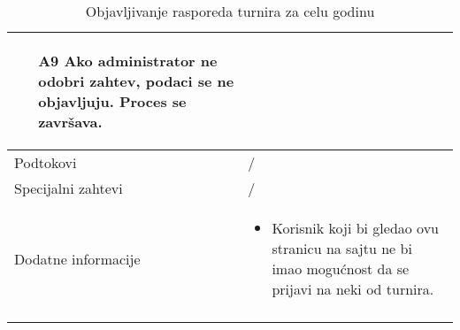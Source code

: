 \documentclass{article}
\begin{document}
\begin{longtable}{| p{} | p{} |}
\begin{itemize}
                    \item[A9] Ako administrator ne odobri zahtev, podaci se ne objavljuju. Proces se završava.
                \end{itemize}\\
        \hline
            Podtokovi & /\\
        \hline
            Specijalni zahtevi & /\\
        \hline
            Dodatne informacije & 
                \begin{itemize}
                    \item Korisnik koji bi gledao ovu stranicu na sajtu ne bi imao mogućnost da se prijavi na neki od turnira.
                \end{itemize}\\
        \hline 
        \caption{Objavljivanje rasporeda turnira za celu godinu}
    \end{longtable}
\end{document}

